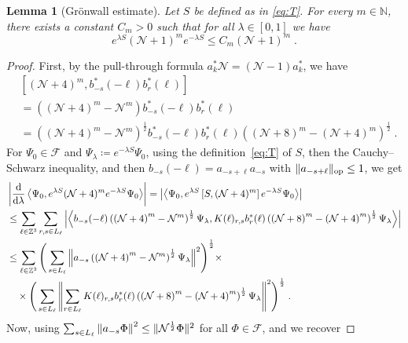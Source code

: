 \documentclass[12pt,a4paper]{article}
\numberwithin{equation}{section}
\newcommand{\cF}{\mathcal{F}}
\newcommand{\cN}{\mathcal{N}}
\newcommand{\NNN}{\mathbb{N}}
\newcommand{\1}{\mathbb{I}}
\newcommand{\di}{\textnormal{d}}
\newcommand{\Ncal}{\mathcal{N}}
\newcommand{\Zstar}{\mathbb{Z}^3} %
\newcommand{\Z}{\mathbb{Z}}
\newcommand{\NN}{\mathcal{N}}
\newcommand{\half}{\frac{1}{2}}
\newcommand{\eva}[1]{\left\langle #1 \right\rangle}
\theoremstyle{plain}
\newtheorem{lemma}[theorem]{Lemma}
\theoremstyle{definition}
\theoremstyle{remark}
\theoremstyle{plain}
\theoremstyle{definition}
\theoremstyle{remark}
\begin{document}
\begin{lemma}[Gr\"onwall estimate]\label{lem:gronNest}
Let $S$ be defined as in \eqref{eq:T}. For every $ m \in \NNN $, there exists a constant $ C_m > 0 $ such that for all $ \lambda\in [0,1]$ we have
\begin{equation}\label{eq:gronest}
	e^{\lambda S} (\mathcal{N} +1)^m e^{-\lambda S}
	\leq C_m (\NN+1)^m \;.
\end{equation}
\end{lemma}
\begin{proof}
First, by the pull-through formula $a^*_k \Ncal = (\Ncal - 1) a^*_k$, we have
\begin{align}
	& \left[(\NN+4)^m, b^*_{-s}(-\ell)b^*_{r}(\ell)\right] \nonumber\\
	&= \left( (\NN+4)^m - \NN^m \right) b^*_{-s}(-\ell)b^*_{r}(\ell) \nonumber\\
	&= \left( \left(\NN+4\right)^m - \NN^m \right)^\half b^*_{-s}(-\ell)b^*_{r}(\ell) \left( \left(\NN+8\right)^m - \left(\NN+4\right)^m \right)^\half \;.
\end{align}
For $ \Psi_0 \in \cF $ and $ \Psi_\lambda \coloneq e^{-\lambda S} \Psi_0 $, using the definition~\eqref{eq:T} of $ S $, then the Cauchy--Schwarz inequality, and then $ b_{-s}(-\ell) = a_{-s+\ell} a_{-s} $ with $ \Vert a_{-s+\ell} \Vert_{\textnormal{op}} \le 1 $, we get
\begin{align*}
	&\left|\frac{\di}{\di\lambda}\eva{\Psi_0, e^{\lambda S} (\mathcal{N}+4)^m e^{-\lambda S} \Psi_0 }\right|
	= \left| \eva{\Psi_0, e^{\lambda S} \left[S, (\NN+4)^m\right] e^{-\lambda S} \Psi_0}\right|\nonumber\\
	&\leq \sum_{\ell\in \Zstar}
		\sum_{r,s\in L_\ell} \abs{\eva{ b_{-s}(-\ell) \left( \left(\NN+4\right)^m - \NN^m \right)^\half \Psi_\lambda, K(\ell)_{r,s} b^*_{r}(\ell) \left( \left(\NN+8\right)^m - \left(\NN+4\right)^m \right)^\half \Psi_\lambda }}\nonumber\\
	&\leq \sum_{\ell\in \Zstar}
		\Bigg( \sum_{s\in L_\ell} \norm{ a_{-s} \left( \left(\NN+4\right)^m - \NN^m \right)^\half \Psi_\lambda}^2 \Bigg)^{\half} \times \nonumber\\
		&\quad \times \Bigg( \sum_{s\in L_\ell}
			\norm { \sum_{r\in L_\ell} K(\ell)_{r,s} b^*_{r}(\ell) \left( \left(\NN+8\right)^m - \left(\NN+4\right)^m \right)^\half \Psi_\lambda}^2 \Bigg)^{\half} \;. \nonumber
\end{align*}
Now, using $ \sum_{s \in L_\ell} \norm{a_{-s} \Phi}^2 \leq \Vert \cN^{\half} \Phi \Vert^2 $ for all $ \Phi \in \cF $, and \cite[Prop.~4.2]{CHN22} we recover

\end{proof}
\end{document}

